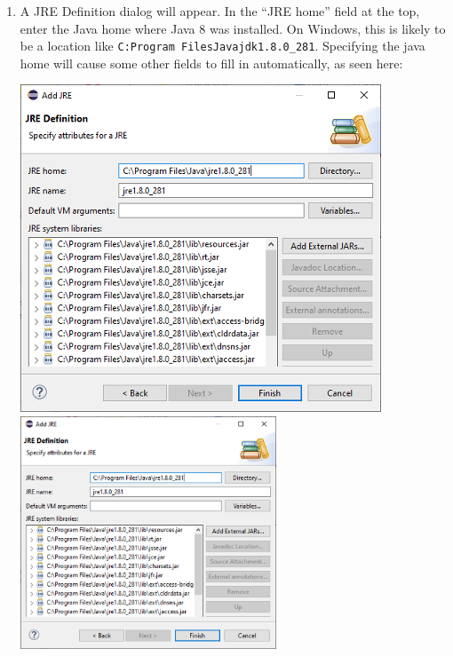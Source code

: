 \begin{enumerate}
\item A {\sf JRE Definition} dialog will appear. In the ``{\sf JRE home}''
field at the top, enter the Java home \directory{} where Java 8 was
installed.
\ifWindows %
On Windows, this is likely to be a location like {\tt C:\BKS Program
Files\BKS Java\BKS jdk1.8.0\_281}. Specifying the java
home \directory{} will cause some other fields to fill in
automatically, as seen here:
\begin{center}
\iflatexml
   \includegraphics[]{images/EclipseJREDefinition}
\else
   \includegraphics[width=0.6\textwidth]{images/EclipseJREDefinition}
\fi
\end{center}
\fi %


\end{enumerate}
